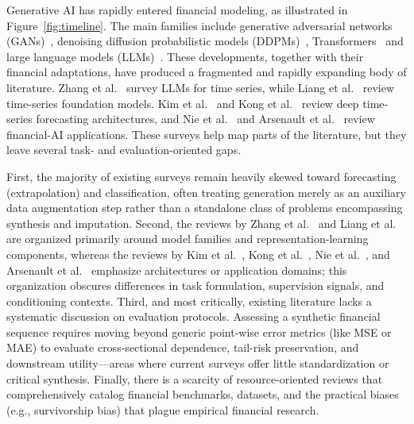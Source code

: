 Generative AI has rapidly entered financial modeling, as illustrated in Figure~\ref{fig:timeline}. The main families include generative adversarial networks (GANs)~\citep{goodfellow2014gan,Time-GAN,wiese2020,naritomi2020data}, denoising diffusion probabilistic models (DDPMs)~\citep{ho2020ddpm,rasul2021timegrad}, Transformers~\citep{vaswani2017attention} and large language models (LLMs)~\citep{brown2020language,jin2024timellm,ansari2024chronos}. These developments, together with their financial adaptations, have produced a fragmented and rapidly expanding body of literature. Zhang et al.~\citep{Survey1} survey LLMs for time series, while Liang et al.~\citep{Survey2} review time-series foundation models. Kim et al.~\citep{Survey3} and Kong et al.~\citep{Survey4} review deep time-series forecasting architectures, and Nie et al.~\citep{FinSurvey1} and Arsenault et al.~\citep{FinSurvey3} review financial-AI applications. These surveys help map parts of the literature, but they leave several task- and evaluation-oriented gaps.

First, the majority of existing surveys remain heavily skewed toward forecasting (extrapolation) and classification, often treating generation merely as an auxiliary data augmentation step rather than a standalone class of problems encompassing synthesis and imputation. Second, the reviews by Zhang et al.~\citep{Survey1} and Liang et al.~\citep{Survey2} are organized primarily around model families and representation-learning components, whereas the reviews by Kim et al.~\citep{Survey3}, Kong et al.~\citep{Survey4}, Nie et al.~\citep{FinSurvey1}, and Arsenault et al.~\citep{FinSurvey3} emphasize architectures or application domains; this organization obscures differences in task formulation, supervision signals, and conditioning contexts. Third, and most critically, existing literature lacks a systematic discussion on evaluation protocols. Assessing a synthetic financial sequence requires moving beyond generic point-wise error metrics (like MSE or MAE) to evaluate cross-sectional dependence, tail-risk preservation, and downstream utility---areas where current surveys offer little standardization or critical synthesis. Finally, there is a scarcity of resource-oriented reviews that comprehensively catalog financial benchmarks, datasets, and the practical biases (e.g., survivorship bias) that plague empirical financial research.

